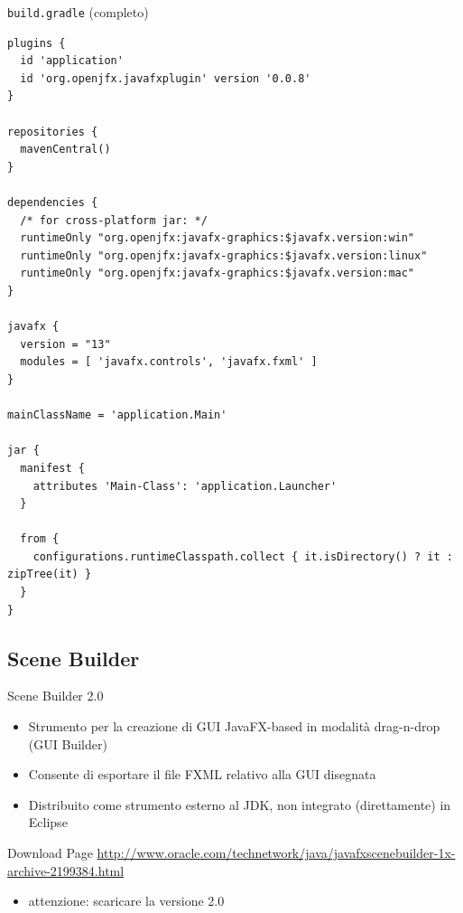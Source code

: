 \documentclass[presentation]{beamer}
\begin{document}
\begin{frame}[fragile]{\texttt{build.gradle} (completo)}
\begin{lstlisting}[basicstyle=\tiny]
plugins {
  id 'application'
  id 'org.openjfx.javafxplugin' version '0.0.8'
}

repositories {
  mavenCentral()
}

dependencies {
  /* for cross-platform jar: */
  runtimeOnly "org.openjfx:javafx-graphics:$javafx.version:win"
  runtimeOnly "org.openjfx:javafx-graphics:$javafx.version:linux"
  runtimeOnly "org.openjfx:javafx-graphics:$javafx.version:mac"
}

javafx {
  version = "13"
  modules = [ 'javafx.controls', 'javafx.fxml' ]
}

mainClassName = 'application.Main'

jar {
  manifest {
    attributes 'Main-Class': 'application.Launcher'
  }

  from {
    configurations.runtimeClasspath.collect { it.isDirectory() ? it : zipTree(it) }
  }
}
\end{lstlisting}
\end{frame}

\subsection{Scene Builder}

\begin{frame}{Scene Builder 2.0}
\begin{itemize}\itemsep10pt
\item Strumento per la creazione di GUI JavaFX-based in modalità drag-n-drop (GUI Builder)
\item Consente di esportare il file FXML relativo alla GUI disegnata
\item Distribuito come strumento esterno al JDK, non integrato (direttamente) in Eclipse
\end{itemize}
\begin{block}{Download Page}
\url{http://www.oracle.com/technetwork/java/javafxscenebuilder-1x-archive-2199384.html}
\begin{itemize}
\item attenzione: scaricare la versione 2.0
\end{itemize}
\end{block}
\end{frame}
\end{document}
